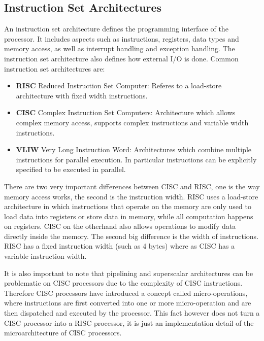 \documentclass[a4paper,10pt]{article}
\begin{document}
\subsection{Instruction Set Architectures}
An instruction set architecture defines the programming interface of the processor. It includes aspects such as instructions, registers,
data types and memory access, as well as interrupt handling and exception handling. The instruction set architecture also defines how
external I/O is done. Common instruction set architectures are:
\begin{itemize}
 \item \textbf{RISC} Reduced Instruction Set Computer: Referes to a load-store architecture with fixed width instructions.
 \item \textbf{CISC} Complex Instruction Set Computers: Architecture which allows complex memory access, supports complex instructions
       and variable width instructions.
 \item \textbf{VLIW} Very Long Instruction Word: Architectures which combine multiple instructions for parallel execution. In particular
       instructions can be explicitly specified to be executed in parallel.
\end{itemize}

There are two very important differences between CISC and RISC, one is the way memory access works, the second is the instruction width.
RISC uses a load-store architecture in which instructions that operate on the memory are only used to load data into registers or store
data in memory, while all computation happens on registers. CISC on the otherhand also allows operations to modify data directly inside
the memory. The second big difference is the width of instructions. RISC has a fixed instruction width (such as 4 bytes) where as CISC
has a variable instruction width.

It is also important to note that pipelining and superscalar architectures can be problematic on CISC processors due to the complexity of
CISC instructions. Therefore CISC processors have introduced a concept called micro-operations, where instructions are first converted
into one or more micro-operation and are then dispatched and executed by the processor. This fact however does not turn a CISC processor
into a RISC processor, it is just an implementation detail of the microarchitecture of CISC processors.
\end{document}
